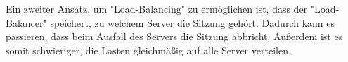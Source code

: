 Ein zweiter Ansatz, um "Load-Balancing" zu ermöglichen ist, dass der "Load-Balancer" speichert, zu welchem Server die Sitzung gehört. Dadurch kann es passieren, dass beim Ausfall des Servers die Sitzung abbricht. Außerdem ist es somit schwieriger, die Lasten gleichmäßig auf alle Server verteilen.



\pagebreak



